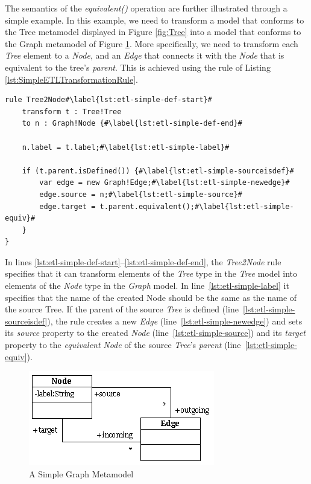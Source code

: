 The semantics of the \emph{equivalent()} operation are further illustrated through a simple example. In this example, we need to transform a model that conforms to the Tree metamodel displayed in Figure \ref{fig:Tree} into a model that conforms to the Graph metamodel of Figure \ref{fig:Graph}. More specifically, we need to transform each \emph{Tree} element to a \emph{Node}, and an \emph{Edge} that connects it with the \emph{Node} that is equivalent to the tree's \emph{parent}. This is achieved using the rule of Listing \ref{lst:SimpleETLTransformationRule}. 

\begin{lstlisting}[float=h, caption=Exemplar ETL Rule demonstrating the \emph{equivalent()} operation, label=lst:SimpleETLTransformationRule, language=ETL, escapechar=\#]
rule Tree2Node#\label{lst:etl-simple-def-start}#
	transform t : Tree!Tree
	to n : Graph!Node {#\label{lst:etl-simple-def-end}#
	
	n.label = t.label;#\label{lst:etl-simple-label}#
	
	if (t.parent.isDefined()) {#\label{lst:etl-simple-sourceisdef}#
		var edge = new Graph!Edge;#\label{lst:etl-simple-newedge}#
		edge.source = n;#\label{lst:etl-simple-source}#
		edge.target = t.parent.equivalent();#\label{lst:etl-simple-equiv}#
	}
}
\end{lstlisting}


In lines \ref{lst:etl-simple-def-start}--\ref{lst:etl-simple-def-end}, the \emph{Tree2Node} rule specifies that it can transform elements of the \emph{Tree} type in the \emph{Tree} model into elements of the \emph{Node} type in the \emph{Graph} model. In line~\ref{lst:etl-simple-label} it specifies that the name of the created Node should be the same as the name of the source Tree. If the parent of the source \emph{Tree} is defined (line~\ref{lst:etl-simple-sourceisdef}), the rule creates a new \emph{Edge} (line~\ref{lst:etl-simple-newedge}) and sets its \emph{source} property to the created \emph{Node} (line~\ref{lst:etl-simple-source}) and its \emph{target} property to the \emph{equivalent} \emph{Node} of the source \emph{Tree}'s \emph{parent} (line~\ref{lst:etl-simple-equiv}).

\begin{figure}
	\centering
		\includegraphics{images/Graph.png}
	\caption{A Simple Graph Metamodel}
	\label{fig:Graph}
\end{figure}


